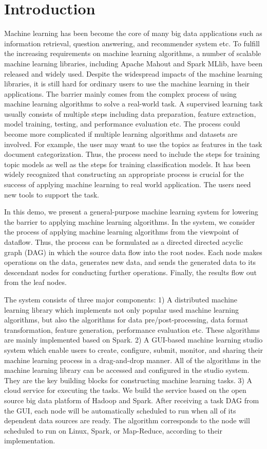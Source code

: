 \documentclass{sig-alternate-05-2015}
\begin{document}

\section{Introduction}
Machine learning has been become the core of many big data applications such as information retrieval, question answering, and recommender system etc. To fulfill the increasing requirements on machine learning algorithms, a number of scalable machine learning libraries, including Apache Mahout and Spark MLlib, have been released and widely used. Despite the widespread impacts of the machine learning libraries, it is still hard for ordinary users to use the machine learning in their applications. The barrier mainly comes from the complex process of using machine learning algorithms to solve a real-world task. A supervised learning task usually consists of multiple steps including data preparation, feature extraction, model training, testing, and performance evaluation etc. The process could become more complicated if multiple learning algorithms and datasets are involved. For example, the user may want to use the topics as features in the task document categorization. Thus, the process need to include the steps for training topic models as well as the steps for training classification models. It has been widely recognized that constructing an appropriate process is crucial for the success of applying machine learning to real world application. The users need new tools to support the task.

In this demo, we present a general-purpose machine learning system for lowering the barrier to applying machine learning algorithms. In the system, we consider the process of applying machine learning algorithms from the viewpoint of dataflow. Thus, the process can be formulated as a directed directed acyclic graph (DAG) in which the source data flow into the root nodes. Each node makes operations on the data, generates new data, and sends the generated data to its descendant nodes for conducting further operations. Finally, the results flow out from the leaf nodes.

The system consists of three major components: 1) A distributed machine learning library which implements not only popular used machine learning algorithms, but also the algorithms for data pre/post-processing, data format transformation, feature generation, performance evaluation etc. These algorithms are mainly implemented based on Spark.  2) A GUI-based machine learning studio system which enable users to create, configure, submit, monitor, and sharing their machine learning process in a drag-and-drop manner. All of the algorithms in the machine learning library can be accessed and configured in the studio system. They are the key building blocks for constructing machine learning tasks. 3) A cloud service for executing the tasks. We build the service based on the open source big data platform of Hadoop and Spark. After receiving a task DAG from the GUI, each node will be automatically scheduled to run when all of its dependent data sources are ready. The algorithm corresponds to the node will scheduled to run on Linux, Spark, or Map-Reduce, according to their implementation.
\end{document}
